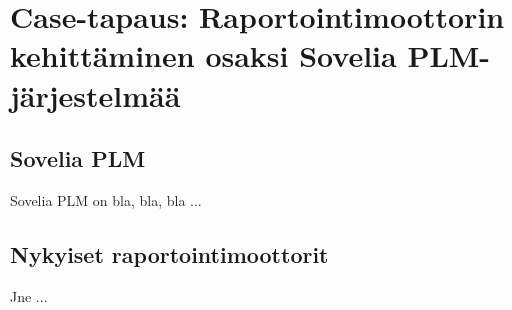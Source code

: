 \chapter{Case-tapaus: Raportointimoottorin kehittäminen osaksi Sovelia PLM-järjestelmää} \label{Case-tapaus: Raportointimoottorin kehittäminen osaksi Sovelia PLM-järjestelmää}

\section{Sovelia PLM} \label{PLM-järjestelmät}

Sovelia PLM on bla, bla, bla ...

\section{Nykyiset raportointimoottorit}

Jne ...
